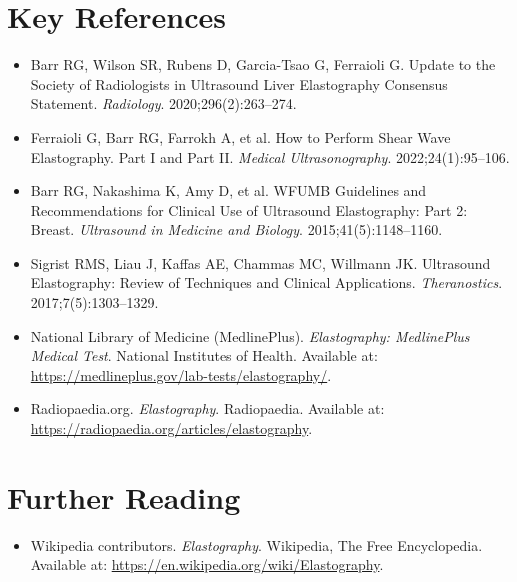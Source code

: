 \section{Key References}

\begin{itemize}
    \item Barr RG, Wilson SR, Rubens D, Garcia-Tsao G, Ferraioli G. Update to the Society of Radiologists in Ultrasound Liver Elastography Consensus Statement. \textit{Radiology}. 2020;296(2):263--274.
    \item Ferraioli G, Barr RG, Farrokh A, et al. How to Perform Shear Wave Elastography. Part I and Part II. \textit{Medical Ultrasonography}. 2022;24(1):95--106.
    \item Barr RG, Nakashima K, Amy D, et al. WFUMB Guidelines and Recommendations for Clinical Use of Ultrasound Elastography: Part 2: Breast. \textit{Ultrasound in Medicine and Biology}. 2015;41(5):1148--1160.
    \item Sigrist RMS, Liau J, Kaffas AE, Chammas MC, Willmann JK. Ultrasound Elastography: Review of Techniques and Clinical Applications. \textit{Theranostics}. 2017;7(5):1303--1329.
    \item National Library of Medicine (MedlinePlus). \textit{Elastography: MedlinePlus Medical Test}. National Institutes of Health. Available at: \url{https://medlineplus.gov/lab-tests/elastography/}.
    \item Radiopaedia.org. \textit{Elastography}. Radiopaedia. Available at: \url{https://radiopaedia.org/articles/elastography}.
\end{itemize}

\section{Further Reading}
\begin{itemize}
  \item Wikipedia contributors. \textit{Elastography}. Wikipedia, The Free Encyclopedia. Available at: \url{https://en.wikipedia.org/wiki/Elastography}.
\end{itemize}
